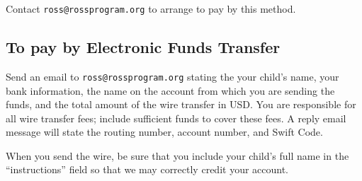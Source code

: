 \documentclass[11pt]{ross}
\begin{document}
Contact \texttt{ross@rossprogram.org} to arrange to pay by this
method.

\subsection*{To pay by Electronic Funds Transfer}

Send an email to \texttt{ross@rossprogram.org} stating the your
child's name, your bank information, the name on the account from
which you are sending the funds, and the total amount of the wire
transfer in USD. You are responsible for all wire transfer fees;
include sufficient funds to cover these fees.  A reply email message
will state the routing number, account number, and Swift Code.

When you send the wire, be sure that you include your child's full
name in the ``instructions'' field so that we may correctly credit
your account.
\end{document}
